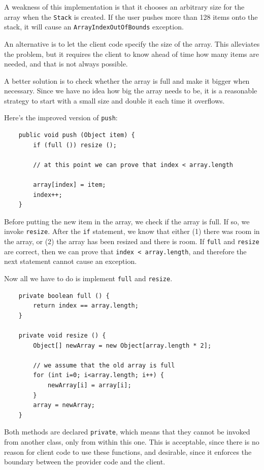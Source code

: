 \documentclass[12pt]{book}
\theoremstyle{exercise}
\begin{document}
A weakness of this implementation is that it chooses
an arbitrary size for the array when the {\tt Stack} is created.  If
the user pushes more than 128 items onto the stack, it will cause
an {\tt ArrayIndexOutOfBounds} exception.


An alternative is to let the client code specify the size of
the array.  This alleviates the problem, but it requires the client
to know ahead of time how many items are needed, and that is not
always possible.

A better solution is to check whether the array is full and make
it bigger when necessary.  Since we have no idea how big the
array needs to be, it is a reasonable strategy to start with a
small size and double it each time it overflows.

Here's the improved version of {\tt push}:

\begin{verbatim}
    public void push (Object item) {
        if (full ()) resize ();

        // at this point we can prove that index < array.length

        array[index] = item;
        index++;
    }
\end{verbatim}
%
Before putting the new item in the array, we check if the array
is full.  If so, we invoke {\tt resize}.  After the {\tt if} statement,
we know that either (1) there was room in the array, or (2) the
array has been resized and there is room.  If {\tt full} and
{\tt resize} are
correct, then we can prove that {\tt index < array.length}, and 
therefore the next statement cannot cause an exception.

Now all we have to do is implement {\tt full} and {\tt resize}.

\begin{verbatim}
    private boolean full () {
        return index == array.length;
    }

    private void resize () {
        Object[] newArray = new Object[array.length * 2];

        // we assume that the old array is full
        for (int i=0; i<array.length; i++) {
            newArray[i] = array[i];
        }
        array = newArray;
    }
\end{verbatim}
%
Both methods are declared {\tt private}, which means that they
cannot be invoked from another class, only from
within this one.  This is acceptable, since there is no reason
for client code to use these functions, and desirable, since
it enforces the boundary between the provider code and the
client.
\end{document}

